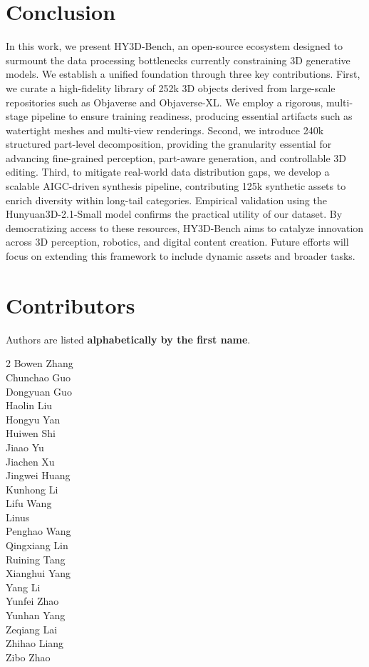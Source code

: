 \documentclass{article} %
\begin{document}
\section{Conclusion}
In this work, we present HY3D-Bench, an open-source ecosystem designed to surmount the data processing bottlenecks currently constraining 3D generative models. We establish a unified foundation through three key contributions. First, we curate a high-fidelity library of 252k 3D objects derived from large-scale repositories such as Objaverse and Objaverse-XL. We employ a rigorous, multi-stage pipeline to ensure training readiness, producing essential artifacts such as watertight meshes and multi-view renderings. Second, we introduce 240k structured part-level decomposition, providing the granularity essential for advancing fine-grained perception, part-aware generation, and controllable 3D editing. Third, to mitigate real-world data distribution gaps, we develop a scalable AIGC-driven synthesis pipeline, contributing 125k synthetic assets to enrich diversity within long-tail categories. Empirical validation using the Hunyuan3D-2.1-Small model confirms the practical utility of our dataset. By democratizing access to these resources, HY3D-Bench aims to catalyze innovation across 3D perception, robotics, and digital content creation. Future efforts will focus on extending this framework to include dynamic assets and broader tasks.



\clearpage


\section{Contributors}
\large{Authors are listed \textbf{alphabetically by the first name}.} 
\large{
\color{tencentblue}%
\begin{multicols}{2}
\raggedcolumns
Bowen Zhang\\
Chunchao Guo\\
Dongyuan Guo\\
Haolin Liu\\
Hongyu Yan\\
Huiwen Shi\\
Jiaao Yu\\
Jiachen Xu\\
Jingwei Huang\\
Kunhong Li\\
Lifu Wang\\
Linus\\
Penghao Wang\\
Qingxiang Lin\\
Ruining Tang\\
Xianghui Yang\\
Yang Li\\
Yunfei Zhao\\
Yunhan Yang\\
Zeqiang Lai\\
Zhihao Liang\\
Zibo Zhao\\
\end{multicols}}
\end{document}
